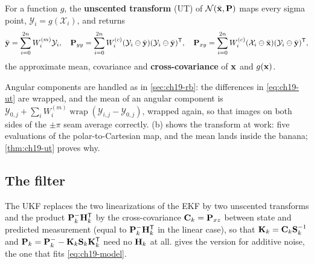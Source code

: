 \begin{definition}
\label{def:ch19-ut}
For a function $g$, the \textbf{unscented transform} (UT) of $\mathcal{N}(\bar{\mathbf{x}}, \mathbf{P})$ maps every sigma point,
$\mathcal{Y}_i = g(\mathcal{X}_i)$, and returns
\begin{equation}
  \bar{\mathbf{y}} = \sum_{i=0}^{2n} W_i^{(m)} \mathcal{Y}_i, \quad
  \mathbf{P}_{yy} = \sum_{i=0}^{2n} W_i^{(c)}
    (\mathcal{Y}_i \ominus \bar{\mathbf{y}})(\mathcal{Y}_i \ominus \bar{\mathbf{y}})^{\mathsf{T}}, \quad
  \mathbf{P}_{xy} = \sum_{i=0}^{2n} W_i^{(c)}
    (\mathcal{X}_i \ominus \bar{\mathbf{x}})(\mathcal{Y}_i \ominus \bar{\mathbf{y}})^{\mathsf{T}},
  \label{eq:ch19-ut}
\end{equation}
the approximate mean, covariance and \textbf{cross-covariance}
 of $\mathbf{x}$ and $g(\mathbf{x})$.
\end{definition}

Angular components are handled as in \cref{sec:ch19-rb}: the differences in
\cref{eq:ch19-ut} are wrapped, and the mean of an angular component is
$\mathcal{Y}_{0,j} + \sum_i W_i^{(m)} \operatorname{wrap}(\mathcal{Y}_{i,j} -
\mathcal{Y}_{0,j})$, wrapped again, so that images on both sides of the
$\pm\pi$ seam average correctly. (b) shows the
transform at work: five evaluations of the polar-to-Cartesian map, and the
mean lands inside the banana; \cref{thm:ch19-ut} proves why.

\subsection{The filter}

The UKF replaces the two linearizations of the EKF by two unscented
transforms and the product $\mathbf{P}_k^-\mathbf{H}_k^{\mathsf{T}}$ by the cross-covariance
$\mathbf{C}_k = \mathbf{P}_{xz}$ between state and predicted measurement (equal
to $\mathbf{P}_k^-\mathbf{H}_k^{\mathsf{T}}$ in the linear case), so that $\mathbf{K}_k =
\mathbf{C}_k\mathbf{S}_k^{-1}$ and $\mathbf{P}_k = \mathbf{P}_k^- -
\mathbf{K}_k\mathbf{S}_k\mathbf{K}_k^{\mathsf{T}}$ need no $\mathbf{H}_k$ at all. 
gives the version for additive noise, the one that fits \cref{eq:ch19-model}.

